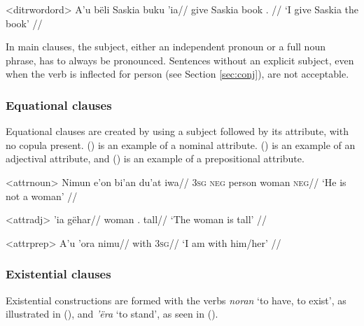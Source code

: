 \documentclass[../hewa_main-subfiles.tex]{subfiles}
\begin{document}
\ex<ditrwordord>
\begingl %
\gla A'u bëli Saskia buku 'ia//
\glb \First{}\Sg{} give Saskia book \Def{}.\Sg{} //
\glft `I give Saskia the book' // 
\endgl
\xe 

In main clauses, the subject, either an independent pronoun or a full noun phrase, has to always be pronounced. Sentences without an explicit subject, even when the verb is inflected for person (see Section \ref{sec:conj}), are not acceptable.

\subsubsection{Equational clauses}

Equational clauses are created by using a subject followed by its attribute, with no copula present. () is an example of a nominal attribute. () is an example of an adjectival attribute, and () is an example of a prepositional attribute. 



\ex<attrnoun>
\begingl %
\gla Nimun e'on bi'an du'at iwa//
\glb \textsc{3sg} \textsc{neg} person woman \textsc{neg}//
\glft `He is not a woman' // 
\endgl %
\xe 

\ex<attradj>
\begingl %
 'ia gëhar//
\glb woman \Def{}.\Sg{} tall//
\glft `The woman is tall' // 
\endgl
\xe 

\ex<attrprep>
\begingl %
\gla A'u 'ora nimu//
\glb {\First{}\Sg{}} with \textsc{3sg}//
\glft `I am with him/her' // 
\endgl
\xe 

\subsubsection{Existential clauses}
Existential constructions are formed with the verbs \textit{noran} `to have, to exist', as illustrated in (), and \textit{'ëra} `to stand', as seen in ().
\end{document}
